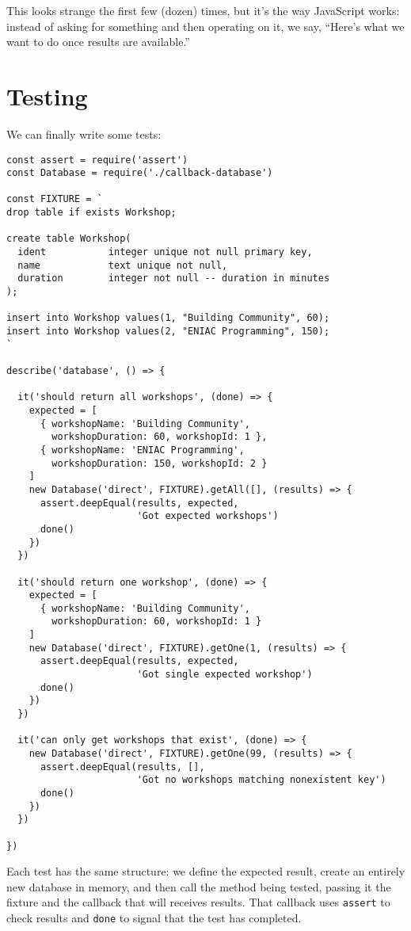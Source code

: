 This looks strange the first few (dozen) times,
but it's the way JavaScript works:
instead of asking for something and then operating on it,
we say,
``Here's what we want to do once results are available.''

\section{Testing}\label{s:db-testing}

We can finally write some tests:

\begin{verbatim}
const assert = require('assert')
const Database = require('./callback-database')

const FIXTURE = `
drop table if exists Workshop;

create table Workshop(
  ident           integer unique not null primary key,
  name            text unique not null,
  duration        integer not null -- duration in minutes
);

insert into Workshop values(1, "Building Community", 60);
insert into Workshop values(2, "ENIAC Programming", 150);
`

describe('database', () => {

  it('should return all workshops', (done) => {
    expected = [
      { workshopName: 'Building Community',
        workshopDuration: 60, workshopId: 1 },
      { workshopName: 'ENIAC Programming',
        workshopDuration: 150, workshopId: 2 }
    ]
    new Database('direct', FIXTURE).getAll([], (results) => {
      assert.deepEqual(results, expected,
                       'Got expected workshops')
      done()
    })
  })

  it('should return one workshop', (done) => {
    expected = [
      { workshopName: 'Building Community',
        workshopDuration: 60, workshopId: 1 }
    ]
    new Database('direct', FIXTURE).getOne(1, (results) => {
      assert.deepEqual(results, expected,
                       'Got single expected workshop')
      done()
    })
  })

  it('can only get workshops that exist', (done) => {
    new Database('direct', FIXTURE).getOne(99, (results) => {
      assert.deepEqual(results, [],
                       'Got no workshops matching nonexistent key')
      done()
    })
  })

})
\end{verbatim}

Each test has the same structure:
we define the expected result,
create an entirely new database in memory,
and then call the method being tested,
passing it the fixture and the callback that will receives results.
That callback uses \texttt{assert} to check results
and \texttt{done} to signal that the test has completed.

